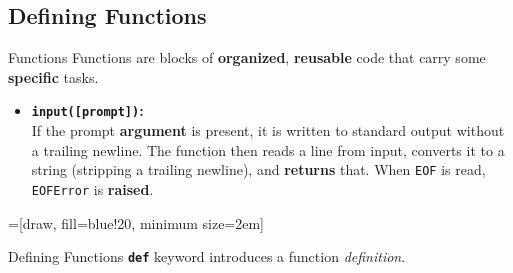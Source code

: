         \subsection{Defining Functions}
        \begin{frame}{Functions}
            \pause
            \LARGE
            Functions are blocks of \textbf{organized}, \textbf{reusable} code that carry some \textbf{specific} tasks.
            \pause
            \begin{itemize}
                \item \textbf{\texttt{input([prompt])}:} \\
                \pause
                If the prompt \textbf<5->{argument} is present, it is written to standard output without a trailing newline. The function then reads a line from input, converts it to a string (stripping a trailing newline), and \textbf<5->{returns} that. When \texttt{EOF} is read, \texttt{EOFError} is \textbf<5->{raised}.   
            \end{itemize}

            \pause
            \pause

            \begin{center}
                =[draw, fill=blue!20, minimum size=2em]

            \end{center}
        \end{frame}   
 
        \begin{frame}{Defining Functions}
            \pause
            \LARGE
            \textbf{\texttt{def}} keyword introduces a function \textit{definition}.
            \normalsize
            \pause
            \inputminted[frame=single,framesep=2pt, lastline=8]{python3}{code-examples/function_def.py}
            \pause
            \inputminted[frame=single,framesep=2pt, lastline=8]{python3}{code-examples/function_def2.py}
            \pause
            \inputminted[frame=single,framesep=2pt, lastline=8]{python3}{code-examples/function_def3.py}
        \end{frame}


